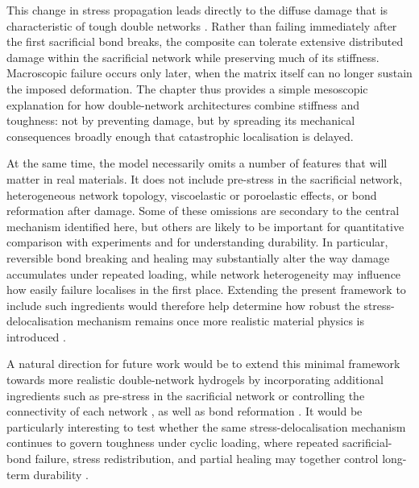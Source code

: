 \documentclass[asymmetricmargins]{library/duthesis}%
\begin{document}
This change in stress propagation leads directly to the diffuse damage that is characteristic of tough double networks \cite{millereauMechanicsElastomericMolecular2018,fukao_effect_2020,ju_role_nodate}. Rather than failing immediately after the first sacrificial bond breaks, the composite can tolerate extensive distributed damage within the sacrificial network while preserving much of its stiffness. Macroscopic failure occurs only later, when the matrix itself can no longer sustain the imposed deformation. The chapter thus provides a simple mesoscopic explanation for how double-network architectures combine stiffness and toughness: not by preventing damage, but by spreading its mechanical consequences broadly enough that catastrophic localisation is delayed.

At the same time, the model necessarily omits a number of features that will matter in real materials. It does not include pre-stress in the sacrificial network, heterogeneous network topology, viscoelastic or poroelastic effects, or bond reformation after damage. Some of these omissions are secondary to the central mechanism identified here, but others are likely to be important for quantitative comparison with experiments and for understanding durability. In particular, reversible bond breaking and healing may substantially alter the way damage accumulates under repeated loading, while network heterogeneity may influence how easily failure localises in the first place. Extending the present framework to include such ingredients would therefore help determine how robust the stress-delocalisation mechanism remains once more realistic material physics is introduced \cite{gong_why_2010,shivers_strain-controlled_2023,wangRapidSelfstrengtheningDoublenetwork2025,yasuiRateIndependentSelfHealingDouble2022,yinSelfHealingHydrogelsSynthesis2023}.

A natural direction for future work would be to extend this minimal framework towards more realistic double-network hydrogels by incorporating additional ingredients such as pre-stress in the sacrificial network or controlling the connectivity of each network \cite{gong_why_2010,shivers_strain-controlled_2023}, as well as bond reformation \cite{wangRapidSelfstrengtheningDoublenetwork2025,yasuiRateIndependentSelfHealingDouble2022,yinSelfHealingHydrogelsSynthesis2023}. It would be particularly interesting to test whether the same stress-delocalisation mechanism continues to govern toughness under cyclic loading, where repeated sacrificial-bond failure, stress redistribution, and partial healing may together control long-term durability \cite{zhang_fatigue_2018,chen_improvement_2016,chen_novel_2015,you_damage_2025}.
\end{document}
